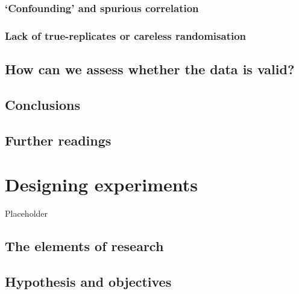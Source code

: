 \documentclass[a4paper,12pt,oneside]{book}
\begin{document}
\hypertarget{confounding-and-spurious-correlation}{%
\subsection{`Confounding' and spurious correlation}\label{confounding-and-spurious-correlation}}

\hypertarget{lack-of-true-replicates-or-careless-randomisation}{%
\subsection{Lack of true-replicates or careless randomisation}\label{lack-of-true-replicates-or-careless-randomisation}}

\hypertarget{how-can-we-assess-whether-the-data-is-valid}{%
\section{How can we assess whether the data is valid?}\label{how-can-we-assess-whether-the-data-is-valid}}

\hypertarget{conclusions}{%
\section{Conclusions}\label{conclusions}}

\hypertarget{further-readings}{%
\section{Further readings}\label{further-readings}}

\hypertarget{designing-experiments}{%
\chapter{Designing experiments}\label{designing-experiments}}

Placeholder

\hypertarget{the-elements-of-research}{%
\section{The elements of research}\label{the-elements-of-research}}

\hypertarget{hypothesis-and-objectives}{%
\section{Hypothesis and objectives}\label{hypothesis-and-objectives}}
\end{document}
